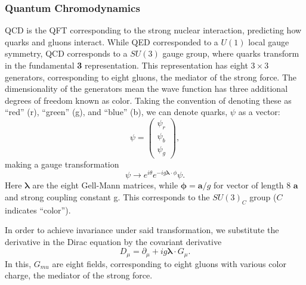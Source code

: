         \subsubsection{Quantum Chromodynamics}

        \gls{QCD} is the \gls{QFT} corresponding to the strong nuclear interaction, predicting how quarks and gluons interact. While \gls{QED} corresponded to a $U(1)$ local gauge symmetry, \gls{QCD} corresponds to a $SU(3)$ gauge group, where quarks transform in the fundamental {\bf 3} representation. This representation has eight $3 \times 3$ generators, corresponding to eight gluons, the mediator of the strong force. The dimensionality of the generators mean the wave function has three additional degrees of freedom known as color. Taking the convention of denoting these as ``red'' (r), ``green'' (g), and ``blue'' (b), we can denote quarks, $\psi$ as a vector:
        \begin{equation}
            \psi =\begin{pmatrix} \psi_{r} \\ \psi_{b} \\ \psi_{g}\end{pmatrix},
        \end{equation}
        making a gauge transformation
        \begin{equation}
        \psi \rightarrow e^{i\theta}e^{-ig {\boldsymbol \lambda\cdot \phi}}\psi.
        \end{equation}
        Here $\boldsymbol \lambda$ are the eight Gell-Mann matrices, while ${\boldsymbol \phi} = {\boldsymbol a}/g$ for vector of length 8 $\boldsymbol a$ and strong coupling constant g. This corresponds to the $SU(3)_C$ group ($C$ indicates ``color'').

        In order to achieve invariance under said transformation, we substitute the derivative in the Dirac equation by the covariant derivative 
        \begin{equation}
            D_{\mu} = \partial_{\mu} + ig {\boldsymbol \lambda\cdot G_{\mu}}.
        \end{equation}
        In this, ${G_{mu}}$ are eight fields, corresponding to eight gluons with various color charge, the mediator of the strong force.

